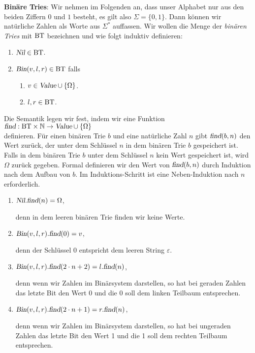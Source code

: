 \exercise
\textbf{Bin\"are Tries}:  Wir nehmen im Folgenden an, dass unser Alphabet nur aus den beiden
Ziffern $0$ und $1$ besteht, es gilt also $\Sigma = \{0,1\}$.  Dann k\"onnen wir nat\"urliche
Zahlen als Worte aus $\Sigma^*$ auffassen.  Wir wollen die Menge der \emph{bin\"aren Tries}
mit $\mathrm{BT}$ bezeichnen und wie folgt induktiv definieren:
\begin{enumerate}
\item $\textsl{Nil} \in \mathrm{BT}$.
\item $\textsl{Bin}(v,l,r) \in \mathrm{BT}$ falls
      \begin{enumerate}
      \item $v \in \textsl{Value} \cup \{\Omega\}$.
      \item $l,r \in \mathrm{BT}$.
      \end{enumerate}
\end{enumerate}
Die Semantik legen wir fest, indem wir eine Funktion
\\[0.2cm]
\hspace*{1.3cm}
$\textsl{find}: \mathrm{BT} \times \mathbb{N} \rightarrow \textsl{Value} \cup \{ \Omega \}$
\\[0.2cm]
definieren.  F\"ur einen bin\"aren Trie $b$ und eine nat\"urliche Zahl $n$ gibt
$\textsl{find}(b,n)$ den Wert zur\"uck, der unter dem Schl\"ussel $n$ in dem bin\"aren Trie $b$ gespeichert ist.
Falls in dem bin\"aren Trie $b$ unter dem Schl\"ussel $n$ kein Wert gespeichert ist, wird
$\Omega$ zur\"uck gegeben.
Formal definieren wir den Wert von $\textsl{find}(b,n)$ durch Induktion nach dem Aufbau
von $b$.  Im Induktions-Schritt ist eine Neben-Induktion nach $n$ erforderlich.
\begin{enumerate}
\item $\textsl{Nil}.\textsl{find}(n) = \Omega$,

      denn in dem leeren bin\"aren Trie finden wir keine Werte.
\item $\textsl{Bin}(v,l,r).\textsl{find}(0) = v$,

      denn der Schl\"ussel $0$ entspricht dem leeren String $\varepsilon$.
\item $\textsl{Bin}(v,l,r).\textsl{find}(2\cdot n + 2) = l.\textsl{find}(n)$,

      denn wenn wir Zahlen im Bin\"arsystem darstellen, so hat bei geraden Zahlen das letzte
      Bit den Wert 0 und die 0 soll dem linken Teilbaum entsprechen.
\item $\textsl{Bin}(v,l,r).\textsl{find}(2 \cdot n + 1) = r.\textsl{find}(n)$,

      denn wenn wir Zahlen im Bin\"arsystem darstellen, so hat bei ungeraden Zahlen das letzte
      Bit den Wert 1 und die 1 soll dem rechten Teilbaum entsprechen.
\end{enumerate}
